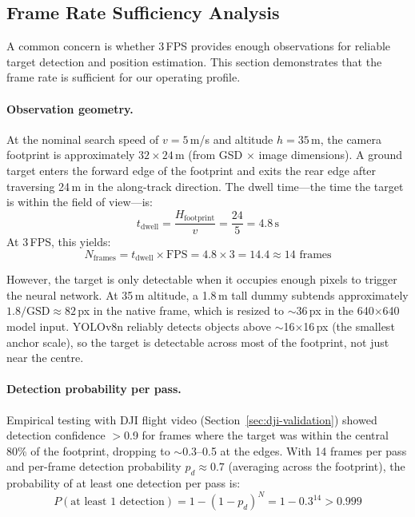 \FloatBarrier
\subsection{Frame Rate Sufficiency Analysis}\label{sec:frame-rate-analysis}

A common concern is whether 3\,FPS provides enough observations for reliable target detection and position estimation.  This section demonstrates that the frame rate is sufficient for our operating profile.

\paragraph{Observation geometry.}
At the nominal search speed of $v = 5$\,m/s and altitude $h = 35$\,m, the camera footprint is approximately $32 \times 24$\,m (from GSD $\times$ image dimensions).  A ground target enters the forward edge of the footprint and exits the rear edge after traversing 24\,m in the along-track direction.  The dwell time---the time the target is within the field of view---is:
\begin{equation}
  t_\mathrm{dwell} = \frac{H_\mathrm{footprint}}{v} = \frac{24}{5} = 4.8\,\mathrm{s}
\end{equation}
At 3\,FPS, this yields:
\begin{equation}
  N_\mathrm{frames} = t_\mathrm{dwell} \times \mathrm{FPS} = 4.8 \times 3 = 14.4 \approx 14 \text{ frames}
\end{equation}

\noindent However, the target is only detectable when it occupies enough pixels to trigger the neural network.  At 35\,m altitude, a 1.8\,m tall dummy subtends approximately $1.8/\mathrm{GSD} \approx 82$\,px in the native frame, which is resized to $\sim$36\,px in the 640$\times$640 model input.  YOLOv8n reliably detects objects above $\sim$16$\times$16\,px (the smallest anchor scale), so the target is detectable across most of the footprint, not just near the centre.

\paragraph{Detection probability per pass.}
Empirical testing with DJI flight video (Section~\ref{sec:dji-validation}) showed detection confidence $>$0.9 for frames where the target was within the central 80\% of the footprint, dropping to $\sim$0.3--0.5 at the edges.  With 14 frames per pass and per-frame detection probability $p_d \approx 0.7$ (averaging across the footprint), the probability of at least one detection per pass is:
\begin{equation}
  P(\text{at least 1 detection}) = 1 - (1 - p_d)^N = 1 - 0.3^{14} > 0.999
\end{equation}


